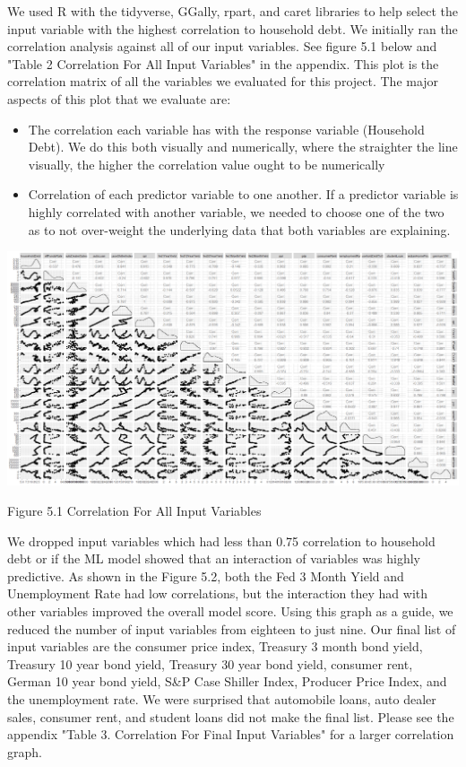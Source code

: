 \documentclass[sigconf,nonacm,11pt]{acmart}
\begin{document}
We used R with the tidyverse, GGally, rpart, and caret libraries to help select the input variable with the highest correlation to household debt. We initially ran the correlation analysis against all of our input variables. See figure 5.1 below and "Table 2 Correlation For All Input Variables" in the appendix. This plot is the correlation matrix of all the variables we evaluated for this project.  The major aspects of this plot that we evaluate are:


\begin{itemize}

\item The correlation each variable has with the response variable (Household Debt).  We do this both visually and numerically, where the straighter the line visually, the higher the correlation value ought to be numerically

\item Correlation of each predictor variable to one another.  If a predictor variable is highly correlated with another variable, we needed to choose one of the two as to not over-weight the underlying data that both variables are explaining.

\end{itemize}

\vspace{0.5em}
\includegraphics[scale = 0.12]{Correlation_Plot_All.png}

Figure 5.1 Correlation For All Input Variables
\vspace{0.75em}

We dropped input variables which had less than 0.75 correlation to household debt or if the ML model showed that an interaction of variables was highly predictive. As shown in the Figure 5.2, both the Fed 3 Month Yield and Unemployment Rate had low correlations, but the interaction they had with other variables improved the overall model score. Using this graph as a guide, we reduced the number of input variables from eighteen to just nine. Our final list of input variables are the consumer price index, Treasury 3 month bond yield, Treasury 10 year bond yield, Treasury 30 year bond yield, consumer rent, German 10 year bond yield, S&P Case Shiller Index, Producer Price Index, and the unemployment rate. We were surprised that automobile loans, auto dealer sales, consumer rent, and student loans did not make the final list. Please see the appendix "Table 3. Correlation For Final Input Variables" for a larger correlation graph.
\end{document}
